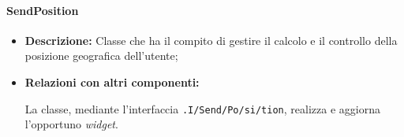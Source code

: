 \paragraph{SendPosition}
\label{sendPosition}
\begin{flushleft}
\begin{itemize}
\item \textbf{Descrizione:} Classe che ha il compito di gestire il calcolo e il controllo della posizione geografica dell'utente;
\item \textbf{Relazioni con altri componenti:}
\begin{sloppypar}
La classe, mediante l'interfaccia \texttt{\viewUser{}.I\fshyp{}Send\fshyp{}Po\fshyp{}si\fshyp{}tion}, realizza e aggiorna l'opportuno \textit{widget}.
\end{sloppypar}
\end{itemize}
\end{flushleft}